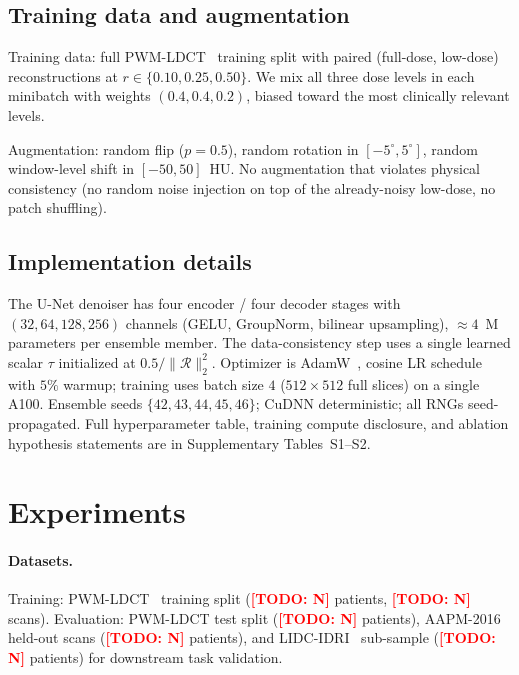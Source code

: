 \documentclass{article}  %
\newcommand{\todo}[1]{\textcolor{red}{\textbf{[TODO: #1]}}}
\begin{document}
\subsection{Training data and augmentation}

Training data: full PWM-LDCT~\citep{ws1dataset} training split with paired (full-dose, low-dose) reconstructions at $r \in \{0.10, 0.25, 0.50\}$. We mix all three dose levels in each minibatch with weights $(0.4, 0.4, 0.2)$, biased toward the most clinically relevant levels.

Augmentation: random flip ($p=0.5$), random rotation in $[-5^\circ, 5^\circ]$, random window-level shift in $[-50, 50]$~HU. No augmentation that violates physical consistency (no random noise injection on top of the already-noisy low-dose, no patch shuffling).

\subsection{Implementation details}
\label{sec:implementation}

The U-Net denoiser has four encoder / four decoder stages with $(32, 64, 128, 256)$ channels (GELU, GroupNorm, bilinear upsampling), $\approx 4$~M parameters per ensemble member. The data-consistency step uses a single learned scalar $\tau$ initialized at $0.5 / \|\mathcal{R}\|_2^2$. Optimizer is AdamW~\citep{loshchilov2018adamw}, cosine LR schedule with $5\%$ warmup; training uses batch size $4$ ($512 \times 512$ full slices) on a single A100. Ensemble seeds $\{42,43,44,45,46\}$; CuDNN deterministic; all RNGs seed-propagated. Full hyperparameter table, training compute disclosure, and ablation hypothesis statements are in Supplementary Tables~S1--S2.


\section{Experiments}
\label{sec:experiments}

\paragraph{Datasets.} Training: PWM-LDCT~\citep{ws1dataset} training split (\todo{N} patients, \todo{N} scans). Evaluation: PWM-LDCT test split (\todo{N} patients), AAPM-2016~\citep{aapm2016challenge} held-out scans (\todo{N} patients), and LIDC-IDRI~\citep{lidc_idri} sub-sample (\todo{N} patients) for downstream task validation.
\end{document}
